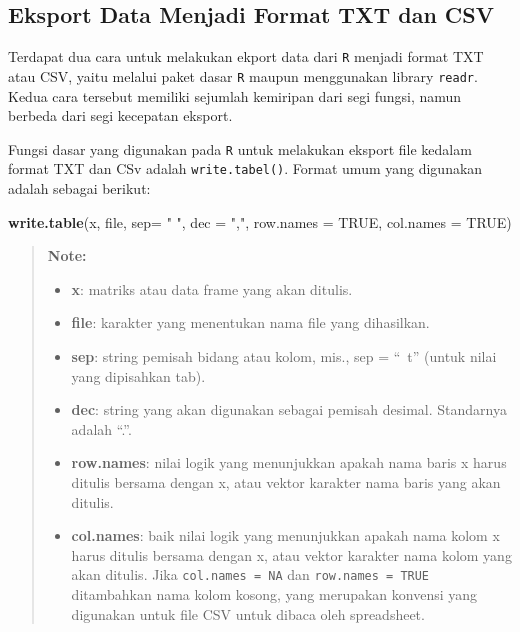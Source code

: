 \documentclass[]{book}
\newenvironment{Shaded}{\begin{snugshade}}{\end{snugshade}}
\newcommand{\KeywordTok}[1]{\textcolor[rgb]{0.13,0.29,0.53}{\textbf{#1}}}
\newcommand{\DataTypeTok}[1]{\textcolor[rgb]{0.13,0.29,0.53}{#1}}
\newcommand{\StringTok}[1]{\textcolor[rgb]{0.31,0.60,0.02}{#1}}
\newcommand{\OtherTok}[1]{\textcolor[rgb]{0.56,0.35,0.01}{#1}}
\newcommand{\NormalTok}[1]{#1}
\providecommand{\tightlist}{%
  \setlength{\itemsep}{0pt}\setlength{\parskip}{0pt}}
\begin{document}
\subsection{Eksport Data Menjadi Format TXT dan
CSV}\label{eksport-data-menjadi-format-txt-dan-csv}

Terdapat dua cara untuk melakukan ekport data dari \texttt{R} menjadi
format TXT atau CSV, yaitu melalui paket dasar \texttt{R} maupun
menggunakan library \texttt{readr}. Kedua cara tersebut memiliki
sejumlah kemiripan dari segi fungsi, namun berbeda dari segi kecepatan
eksport.

Fungsi dasar yang digunakan pada \texttt{R} untuk melakukan eksport file
kedalam format TXT dan CSv adalah \texttt{write.tabel()}. Format umum
yang digunakan adalah sebagai berikut:

\begin{Shaded}
\begin{Highlighting}[]
\KeywordTok{write.table}\NormalTok{(x, file, }\DataTypeTok{sep=} \StringTok{" "}\NormalTok{, }\DataTypeTok{dec =} \StringTok{","}\NormalTok{,}
            \DataTypeTok{row.names =} \OtherTok{TRUE}\NormalTok{, }\DataTypeTok{col.names =} \OtherTok{TRUE}\NormalTok{)}
\end{Highlighting}
\end{Shaded}

\begin{quote}
\textbf{Note: }

\begin{itemize}
\tightlist
\item
  \textbf{x}: matriks atau data frame yang akan ditulis.
\item
  \textbf{file}: karakter yang menentukan nama file yang dihasilkan.
\item
  \textbf{sep}: string pemisah bidang atau kolom, mis., sep = ``~t''
  (untuk nilai yang dipisahkan tab).
\item
  \textbf{dec}: string yang akan digunakan sebagai pemisah desimal.
  Standarnya adalah ``.''.
\item
  \textbf{row.names}: nilai logik yang menunjukkan apakah nama baris x
  harus ditulis bersama dengan x, atau vektor karakter nama baris yang
  akan ditulis.
\item
  \textbf{col.names}: baik nilai logik yang menunjukkan apakah nama
  kolom x harus ditulis bersama dengan x, atau vektor karakter nama
  kolom yang akan ditulis. Jika \texttt{col.names\ =\ NA} dan
  \texttt{row.names\ =\ TRUE} ditambahkan nama kolom kosong, yang
  merupakan konvensi yang digunakan untuk file CSV untuk dibaca oleh
  spreadsheet.
\end{itemize}
\end{quote}
\end{document}
